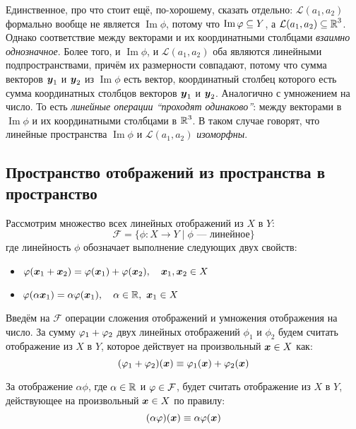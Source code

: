 \documentclass[a4paper,12pt]{article}
\DeclareMathOperator{\Imag}{Im}
\begin{document}
\begin{solution}
    Единственное, про что стоит ещё, по-хорошему, сказать отдельно: $\mathcal L(a_1, a_2)$ формально вообще не является $\Imag\phi$, потому что $\Imag\phi \hm\subseteq Y$, а $\mathcal L(a_1, a_2) \hm\subseteq \RR^3$.
    Однако соответствие между векторами и их координатными столбцами \emph{взаимно однозначное}.
    Более того, и $\Imag\phi$, и $\mathcal L(a_1, a_2)$ оба являются линейными подпространствами, причём их размерности совпадают, потому что сумма векторов $\boldsymbol y_1$ и $\boldsymbol y_2$ из $\Imag \phi$ есть вектор, координатный столбец которого есть сумма координатных столбцов векторов $\boldsymbol y_1$ и $\boldsymbol y_2$.
    Аналогично с умножением на число.
    То есть \emph{линейные операции ``проходят одинаково''}: между векторами в $\Imag \phi$ и их координатными столбцами в $\operatorname{\mathbb R}^3$.
    В таком случае говорят, что линейные пространства $\Imag\phi$ и $\mathcal L(a_1, a_2)$ \emph{изоморфны}.
  \end{solution}
  
  
  \subsection{Пространство отображений из пространства в пространство}
  \label{sec:plot2}
  
  Рассмотрим множество всех линейных отображений из $X$ в $Y$:
  \[
    \mathcal F = \{\phi\colon X \to Y \mid \phi\mbox{~---~линейное}\}
  \]
  где линейность $\phi$ обозначает выполнение следующих двух свойств:
  \begin{itemize}
    \item $\varphi(\boldsymbol x_1 + \boldsymbol x_2) = \varphi(\boldsymbol x_1) + \varphi(\boldsymbol x_2),\quad \boldsymbol x_1, \boldsymbol x_2 \in X$
    \item $\varphi(\alpha \boldsymbol x_1) = \alpha \varphi(\boldsymbol x_1),\quad \alpha \in \operatorname{\mathbb R},\ \boldsymbol x_1 \in X$
  \end{itemize}
  
  Введём на $\mathcal F$ операции сложения отображений и умножения отображения на число.
  За сумму $\phi_1 \hm+ \phi_2$ двух линейных отображений $\phi_1$ и $\phi_2$ будем считать отображение из $X$ в $Y$, которое действует на произвольный $\bds x \hm\in X$ как:
  \[
    (\varphi_1 + \varphi_2) (\boldsymbol x) \equiv \varphi_1(\boldsymbol x) + \varphi_2(\boldsymbol x)
  \]
  
  За отображение $\alpha\phi$, где $\alpha \hm\in \RR$ и $\phi \hm\in \mathcal F$, будет считать отображение из $X$ в $Y$, действующее на произвольный $\bds x \hm\in X$ по правилу:
  \[
    (\alpha \varphi) (\boldsymbol x) \equiv \alpha \varphi(\boldsymbol x)
  \]
  
\end{document}
